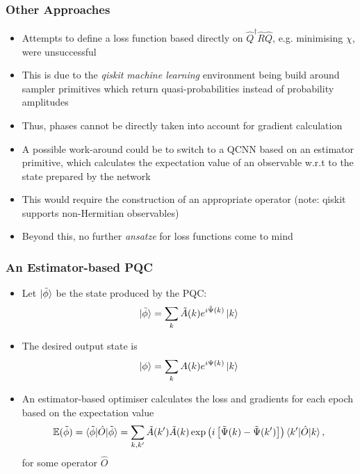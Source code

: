 \documentclass{beamer}
\begin{document}
\begin{frame}
\frametitle{Other Approaches}
\begin{itemize}
\item Attempts to define a loss function based directly on $\hat{Q}^\dagger \hat{R} \hat{Q}$, e.g. minimising $\chi$, were \alert{unsuccessful} 
\item This is due to the \emph{qiskit machine learning} environment being build around \alert{sampler primitives} which return quasi-probabilities instead of probability amplitudes 
\item Thus, phases cannot be directly taken into account for gradient calculation 
\item A possible work-around could be to switch to a QCNN based on an \alert{estimator primitive}, which calculates the expectation value of an observable w.r.t to the state prepared by the network 
\item This would require the construction of an \alert{appropriate operator} (note: qiskit supports non-Hermitian observables) 
\item Beyond this, no further \emph{ansatze} for loss functions come to mind
\end{itemize}
\end{frame}

\begin{frame}
\frametitle{An Estimator-based PQC}
\begin{itemize}
\item Let $\ket{\tilde{\phi}}$ be the state produced by the PQC:
\begin{equation}
\ket{\tilde{\phi}}= \sum_k \tilde{A}(k) e^{i \tilde{\Psi}(k)} \ket{k}
\end{equation}
\item The desired output state is 
\begin{equation}
\ket{\phi}= \sum_k A(k) e^{i \Psi(k)} \ket{k}
\end{equation}
\item An estimator-based optimiser calculates the loss and gradients for each epoch based on the expectation value 
\begin{equation} \mathbb{E}(\tilde{\phi}) = \braket{\tilde{\phi}| \hat{O}| \tilde{\phi}} = \sum_{k, k'} \tilde{A}(k')\tilde{A}(k) \exp \left(i \left[ \tilde{\Psi}(k) - \tilde{\Psi}(k') \right] \right) \braket{k' | \hat{O}| k}, 
\end{equation}
for some operator $\hat{O}$
\end{itemize}
\end{frame}
\end{document}
